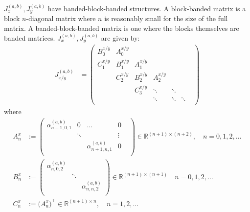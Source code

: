 \documentclass[11pt, oneside]{article}   	%
\newcommand{\R}{\mathbb{R}}
\newcommand{\alphaab}{\alpha^{(a,b)}}
\begin{document}
$J_x^{(a,b)}, J_y^{(a,b)}$ have banded-block-banded structures. A block-banded matrix is a block $n$-diagonal matrix where $n$ is reasonably small for the size of the full matrix. A banded-block-banded matrix is one where the blocks themselves are banded matrices. $J_x^{(a,b)}, J_y^{(a,b)}$ are given by:
\begin{align*}
J_{x/y}^{(a,b)} &= \begin{pmatrix}
		B^{x/y}_0 & A^{x/y}_0 & & & & \\
		C^{x/y}_1 & B^{x/y}_1 & A^{x/y}_1 & & & \\
		& C^{x/y}_2 & B^{x/y}_2 & A^{x/y}_2  & & & \\
		& & C^{x/y}_3 & \ddots & \ddots & \\
		& & & \ddots & \ddots & \ddots \\
	\end{pmatrix}
\end{align*}
where
\begin{align*}
A^x_n &:= \begin{pmatrix}
		\alphaab_{n+1,0,1} & 0 & \hdots & 0 \\
		& \ddots & & \vdots & \\
		& & \alphaab_{n+1,n,1} & 0 \\
	    \end{pmatrix} \in \R^{(n+1)\times(n+2)}, \quad n = 0,1,2,\dots \\
B^x_n &:= \begin{pmatrix}
		\alphaab_{n,0,2} & & \\
		& \ddots & \\
		& & \alphaab_{n,n,2} \\
	    \end{pmatrix} \in \R^{(n+1)\times(n+1)} \quad n = 0,1,2,\dots \\
C^x_n &:= \big( A^x_n \big)^\top \in \R^{(n+1)\times n},  \quad n = 1,2,\dots \\ 
\nonumber
\end{align*}
\end{document}
